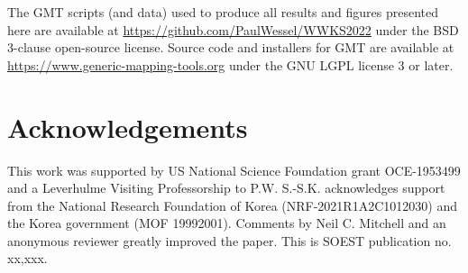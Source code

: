 The GMT scripts (and data) used to produce all results and figures presented here
are available at \url{https://github.com/PaulWessel/WWKS2022}
under the BSD 3-clause open-source license.
Source code and installers for GMT are available at
\url{https://www.generic-mapping-tools.org} under the GNU LGPL license 3 or later.


\section{Acknowledgements}
This work was supported by US National Science Foundation grant OCE-1953499
and a Leverhulme Visiting Professorship to P.W.
S.-S.K. acknowledges support from the National Research Foundation of Korea
(NRF-2021R1A2C1012030) and the Korea government (MOF 19992001). Comments by
Neil C. Mitchell and an anonymous reviewer greatly improved the paper.
This is SOEST publication no. xx,xxx.
